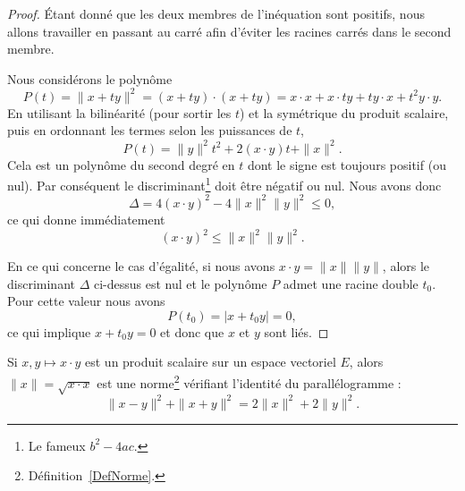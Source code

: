 \begin{proof}
	Étant donné que les deux membres de l'inéquation sont positifs, nous allons travailler en passant au carré afin d'éviter les racines carrés dans le second membre.

	Nous considérons le polynôme
	\begin{equation}
		P(t)=\| x+ty \|^2=(x+ty)\cdot(x+ty)=x\cdot x+x\cdot ty+ty\cdot x+t^2y\cdot y.
	\end{equation}
    En utilisant la bilinéarité (pour sortir les \( t\)) et la symétrique du produit scalaire, puis en ordonnant les termes selon les puissances de $t$,
	\begin{equation}
		P(t)=\| y \|^2t^2+2(x\cdot y)t+\| x \|^2.
	\end{equation}
	Cela est un polynôme du second degré en $t$ dont le signe est toujours positif (ou nul). Par conséquent le discriminant\footnote{Le fameux $b^2-4ac$.} doit être négatif ou nul. Nous avons donc
	\begin{equation}
		\Delta=4(x\cdot y)^2-4\| x \|^2\| y \|^2\leq 0,
	\end{equation}
	ce qui donne immédiatement
	\begin{equation}
		(x\cdot y)^2\leq\| x \|^2\| y \|^2.
	\end{equation}

    En ce qui concerne le cas d'égalité, si nous avons \( x\cdot y=\| x \|\| y \|\), alors le discriminant \( \Delta\) ci-dessus est nul et le polynôme \( P\) admet une racine double \( t_0\). Pour cette valeur nous avons
    \begin{equation}
        P(t_0)=| x+t_0y |=0,
    \end{equation}
    ce qui implique \( x+t_0y=0\) et donc que \( x\) et \( y\) sont liés.
\end{proof}

\begin{proposition} \label{PropEQRooQXazLz}
    Si \( x,y\mapsto x\cdot y\) est un produit scalaire sur un espace vectoriel \( E\), alors \( \| x \|=\sqrt{x\cdot x}\) est une norme\footnote{Définition~\ref{DefNorme}.} vérifiant l'identité du parallélogramme :
    \begin{equation}        \label{EqYCLtWfJ}
        \| x-y \|^2+\| x+y \|^2=2\| x \|^2+2\| y \|^2.
    \end{equation}
\end{proposition}

